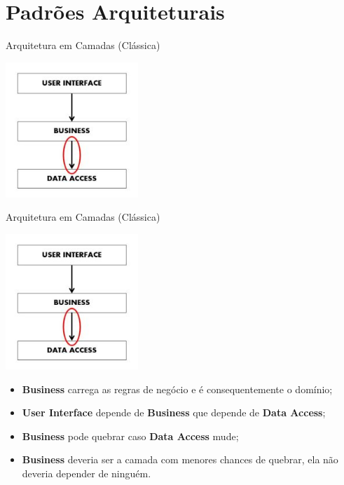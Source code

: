 \documentclass[aspectratio=169]{beamer}
\begin{document}
\section{Padrões Arquiteturais}
\begin{frame}{Arquitetura em Camadas (Clássica)}	
	\begin{center}
		\includegraphics[width=5cm]{imgs/layered-architecture}
	\end{center}
\end{frame}

\begin{frame}{Arquitetura em Camadas (Clássica)}	
	\begin{multicols}{2}		
		\begin{center}
			\includegraphics[width=5cm]{imgs/layered-architecture}
		\end{center}
		\begin{itemize}	
			\item \textbf{Business} carrega as regras de negócio e é consequentemente o domínio;
			\item \textbf{User Interface} depende de \textbf{Business} que depende de \textbf{Data Access};
			\item \textbf{Business} pode quebrar caso \textbf{Data Access} mude;
			\item \textbf{Business} deveria ser a camada com menores chances de quebrar, ela não deveria depender de ninguém.
		\end{itemize}
	\end{multicols}
\end{frame}
\end{document}
